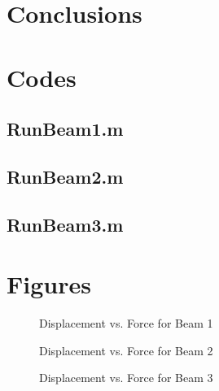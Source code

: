 \documentclass{article}
\begin{document}
\section{Conclusions}
\pagebreak

\appendix
\section{Codes}
\subsection{RunBeam1.m}
\pagebreak 
\subsection{RunBeam2.m}
\pagebreak 
\subsection{RunBeam3.m}
\pagebreak  %

\section{Figures}
\begin{figure}[htb]
\begin{center}
\caption{Displacement vs. Force for Beam 1}
\end{center}
\end{figure}

\begin{figure}[htb]
\begin{center}
\caption{Displacement vs. Force for Beam 2}
\end{center}
\end{figure}

\begin{figure}[htb]
\begin{center}
\caption{Displacement vs. Force for Beam 3}
\end{center}
\end{figure}
\end{document}
